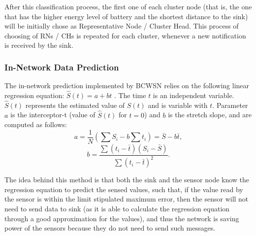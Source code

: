 \documentclass[conference]{IEEEtran}
\begin{document}
After this classification process, the first one of each cluster node (that is,
the one that has the higher energy level of battery and the shortest distance to
the sink) will be initially chose as Representative Node / Cluster Head. This
process of choosing of RNs / CHs is repeated for each cluster, whenever a new
notification is received by the sink.


\subsubsection{In-Network Data Prediction}
\label{data-predict}

The in-network prediction implemented by BCWSN relies on the
following linear regression equation: $\hat{S}(t) = a + bt$ \cite{MaiaACR2013}.
The time $t$ is an independent variable. $\hat{S}(t)$ represents the estimated
value of $S(t)$ and is variable with $t$. Parameter $a$ is the interceptor-t
(value of $\hat{S}(t)$ for $t=0$) and $b$ is the stretch slope, and are computed
as follows:
\begin{equation}
	a = \frac{1}{N}\left(\sum S_{i} - b\sum t_{i} \right) = \bar{S} - b\bar{t},
\end{equation}
\vspace*{-.3cm}
\begin{equation}
	b = \frac{\sum \left(t_{i} - \bar{t}\right)\left(S_{i} - \bar{S}\right)}{\sum \left(t_{i} - \bar{t}\right)^{2}}.
\end{equation}

The idea behind this method is that both the sink and the sensor node know the
regression equation to predict the sensed values, such that, if the value read
by the sensor is within the limit stipulated maximum error, then the sensor will
not need to send data to sink (as it is able to calculate the regression
equation through a good approximation for the values), and thus the network is
saving power of the sensors because they do not need to send such messages.
\end{document}
